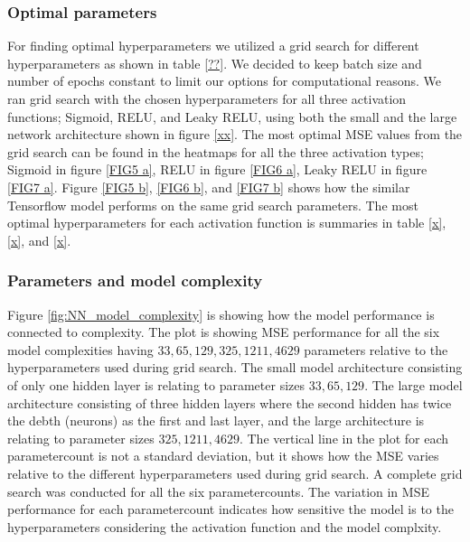 \documentclass
[twocolumn,
secnumarabic,
nobibnotes,
aps,
prl,
reprint,
groupedaddress,
amsmath,
amssymb
]{revtex4-2}
\begin{document}
\subsubsection{Optimal parameters}
For finding optimal hyperparameters we utilized a grid search for different hyperparameters as shown in table \ref{??}. We decided to keep batch size and number of epochs constant to limit our options for computational reasons.  We ran grid search with the chosen hyperparameters for all three activation functions; Sigmoid, RELU, and Leaky RELU, using both the small and the large network architecture shown in figure \ref{xx}.  The most optimal MSE values from the grid search can be found in the heatmaps for all the three activation types; Sigmoid in figure \ref{FIG5 a}, RELU in figure \ref{FIG6 a}, Leaky RELU in figure \ref{FIG7 a}. Figure \ref{FIG5 b}, \ref{FIG6 b}, and \ref{FIG7 b} shows how the similar Tensorflow model performs on the same grid search parameters. The most optimal hyperparameters for each activation function is summaries in table \ref{x}, \ref{x}, and \ref{x}.




\subsubsection{Parameters and model complexity}
Figure \ref{fig:NN_model_complexity} is showing how the model performance is connected to complexity. The plot is showing MSE performance for all the six model complexities having $33,65,129,325,1211,4629$ parameters relative to the hyperparameters used during grid search. The small model architecture consisting of only one hidden layer is relating to parameter sizes $33,65,129$. The large model architecture consisting of three hidden layers where the second hidden has twice the debth (neurons) as the first and last layer, and the large architecture is relating to parameter sizes $325,1211,4629$. The vertical line in the plot for each parametercount is not a standard deviation, but it shows how the MSE varies relative to the different hyperparameters used during grid search. A complete grid search was conducted for all the six parametercounts. The variation in MSE performance for each parametercount indicates how sensitive the model is to the hyperparameters considering the activation function and the model complxity.\\\\
\end{document}
